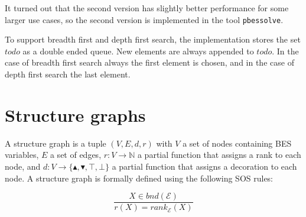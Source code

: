 \documentclass{article}
\begin{document}
It turned out that the second version has slightly better performance for
some larger use cases, so the second version is implemented in the tool \texttt{pbessolve}.

To support breadth first and depth first search, the implementation stores the
set $todo$ as a double ended queue. New elements are always appended to $todo$.
In the case of breadth first search always the first element is chosen, and in the
case of depth first search the last element.

\section{Structure graphs}
A structure graph is a tuple $(V,E,d,r)$ with $V$ a set of nodes containing BES variables,
$E$ a set of edges, $r:V\rightarrow \mathbb{N}$ a partial function that assigns a rank to each node,
and $d:V\rightarrow \{\blacktriangle ,\blacktriangledown ,\top ,\bot \}$ a partial function that
assigns a decoration to each node. A structure graph is formally defined using the
following SOS rules:

\begin{equation*}
\frac{X\in bnd(\mathcal{E})}{r(X) = rank_{\mathcal{E}}(X)}
\end{equation*}
\end{document}
